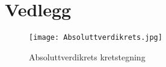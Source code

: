 
\section*{Vedlegg}

\begin{figure}[h]
  \texttt{[image: Absoluttverdikrets.jpg]}
  \caption{Absoluttverdikrets kretstegning}
  \label{Kretstegning:1}
\end{figure}
